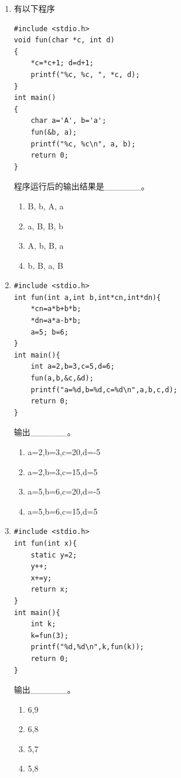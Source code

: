 \documentclass[a4paper,12pt]{article}
\begin{document}
\begin{enumerate}
	\item 有以下程序
	      \begin{verbatim}
#include <stdio.h>
void fun(char *c, int d)
{
    *c=*c+1; d=d+1;
    printf("%c, %c, ", *c, d);
}
int main()
{
    char a='A', b='a';
    fun(&b, a);
    printf("%c, %c\n", a, b);
    return 0;
}
    \end{verbatim}
	      程序运行后的输出结果是\_\_\_\_\_\_。
	      \begin{enumerate}
		      \item[A)] B, b, A, a
		      \item[B)] a, B, B, b
		      \item[C)] A, b, B, a
		      \item[D)] b, B, a, B
	      \end{enumerate}
	      \vspace{0.3cm}

	\item
	      \begin{verbatim}
#include <stdio.h>
int fun(int a,int b,int*cn,int*dn){
    *cn=a*b+b*b;
    *dn=a*a-b*b;
    a=5; b=6;
}
int main(){
    int a=2,b=3,c=5,d=6;
    fun(a,b,&c,&d);
    printf("a=%d,b=%d,c=%d\n",a,b,c,d);
    return 0;
}
    \end{verbatim}
	      输出\_\_\_\_\_\_。
	      \begin{enumerate}
		      \item[A)] a=2,b=3,c=20,d=-5
		      \item[B)] a=2,b=3,c=15,d=5
		      \item[C] a=5,b=6,c=20,d=-5
		      \item[D] a=5,b=6,c=15,d=5
	      \end{enumerate}
	      \vspace{0.3cm}

	\item
	      \begin{verbatim}
#include <stdio.h>
int fun(int x){
    static y=2;
    y++;
    x+=y;
    return x;
}
int main(){
    int k;
    k=fun(3);
    printf("%d,%d\n",k,fun(k));
    return 0;
}
    \end{verbatim}
	      输出\_\_\_\_\_\_。
	      \begin{enumerate}
		      \item[A)] 6,9
		      \item[B)] 6,8
		      \item[C] 5,7
		      \item[D] 5,8
	      \end{enumerate}
	      \vspace{0.3cm}


\end{enumerate}
\end{document}
